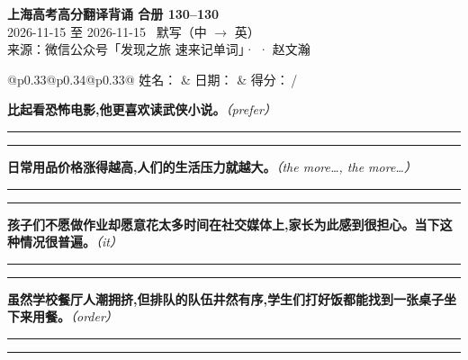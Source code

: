 \documentclass[11pt,a4paper]{article}
\newcommand{\num}[1]{\makebox[1.9em][r]{#1.}\hspace{0.3em}}
\newcommand{\wline}{\noindent\rule{\linewidth}{0.4pt}}
\newcommand{\prompt}[1]{\emph{\textcolor{tipblue}{\small（#1）}}}
\begin{document}
\pagestyle{plain}
\begin{center}
{\LARGE\bfseries 上海高考高分翻译背诵 \quad 合册 130–130}\\[0.25em]
{\large 2026-11-15 至 2026-11-15 \quad\ 默写（中 $\to$ 英）}\\[0.35em]
{\footnotesize 来源：微信公众号「发现之旅 速来记单词」·  · 赵文瀚}
\end{center}

\vspace{0.4em}
\noindent\begin{tabular}{@{}p{0.33\textwidth}@{}p{0.34\textwidth}@{}p{0.33\textwidth}@{}}
姓名：\underline{\hspace{2.0cm}} & 日期：\underline{\hspace{2.0cm}} & 得分：\underline{\hspace{1.4cm}}\,/ \\
\end{tabular}

\vspace{0.5em}

\vspace{0.8em}
\vspace{0.35em}\vspace{0.15em}

\begin{minipage}{\linewidth}

\num{1}\textbf{比起看恐怖电影,他更喜欢读武侠小说。}\prompt{prefer}

\vspace{0.3em}

\wline\vspace{0.3em}
\wline

\end{minipage}

\begin{minipage}{\linewidth}

\num{2}\textbf{日常用品价格涨得越高,人们的生活压力就越大。}\prompt{the more…, the more…}

\vspace{0.3em}

\wline\vspace{0.3em}
\wline

\end{minipage}

\begin{minipage}{\linewidth}

\num{3}\textbf{孩子们不愿做作业却愿意花太多时间在社交媒体上,家长为此感到很担心。当下这种情况很普遍。}\prompt{it}

\vspace{0.3em}

\wline\vspace{0.3em}
\wline

\end{minipage}

\begin{minipage}{\linewidth}

\num{4}\textbf{虽然学校餐厅人潮拥挤,但排队的队伍井然有序,学生们打好饭都能找到一张桌子坐下来用餐。}\prompt{order}

\vspace{0.3em}

\wline\vspace{0.3em}
\wline

\end{minipage}
\end{document}

